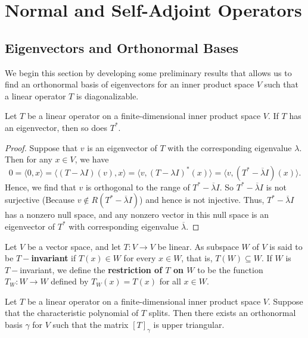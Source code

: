 \section{Normal and Self-Adjoint Operators}

\subsection{Eigenvectors and Orthonormal Bases}

We begin this section by developing some preliminary results that allows us to find an orthonormal basis of eigenvectors for an inner product space \( V  \) such that a linear operator \(  T  \) is diagonalizable.

\begin{lemma}
    Let \( T  \) be a linear operator on a finite-dimensional inner product space \( V  \). If \( T  \) has an eigenvector, then so does \( T^{*} \).
\end{lemma}
\begin{proof}
Suppose that \( v  \) is an eigenvector of \( T  \) with the corresponding eigenvalue \( \lambda  \). Then for any \( x \in V  \), we have
\[  0 = \langle 0  , x  \rangle =  \langle  (T - \lambda I )(v) , x   \rangle = \langle v  ,  (T - \lambda I )^{*}(x) \rangle = \langle v  ,  (T^{*} - \overline{\lambda} I)(x) \rangle. \]
Hence, we find that \( v  \) is orthogonal to the range of \( T^{*} - \overline{\lambda} I  \). So \( T^{*} - \overline{\lambda} I  \) is not surjective (Because \( v \notin R(T^{*} - \overline{\lambda} I ) \)) and hence is not injective. Thus,  \( T^{*} - \overline{\lambda}I  \) has a nonzero null space, and any nonzero vector in this null space is an eigenvector of \( T^{*} \) with corresponding eigenvalue \( \overline{\lambda} \).
\end{proof}

\begin{definition}[T-Invariance]
    Let \( V  \) be a vector space, and let \( T: V \to V  \) be linear. As subspace \( W  \) of \( V  \) is said to be \textbf{\( T- \)invariant} if \( T(x) \in W  \) for every \( x \in W  \), that is, \( T(W) \subseteq W  \). If \( W  \) is \( T- \)invariant, we define the \textbf{restriction of \( T \) on \( W  \)} to be the function \( {T}_{W}: W \to W  \) defined by \( {T}_{W}(x) = T(x) \) for all \( x \in W \).
\end{definition}

\begin{theorem}[Schur]
    Let \( T  \) be a linear operator on a finite-dimensional inner product space \( V  \). Suppose that the characteristic polynomial of \( T \) splits. Then there exists an orthonormal basis \( \gamma \) for \( V  \) such that the matrix \( [T]_{\gamma} \) is upper triangular.
\end{theorem}

